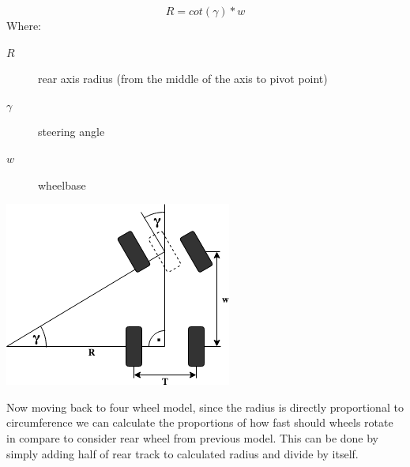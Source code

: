 \vspace{1em}
\begin{minipage}{0.6\textwidth}
    \begin{equation}\label{diff_eq_w}
        R = cot( \gamma ) * w
    \end{equation}
    Where:
    \begin{description}
        \item[$R$] rear axis radius (from the middle of the axis to pivot point)
        \item[$\gamma$] steering angle
        \item[$w$] wheelbase
    \end{description}
\end{minipage}
\hfill
\begin{minipage}{0.35\textwidth}
    \includegraphics[width=\textwidth]{figures/diff_calc}
\end{minipage}
\vspace{1em}

Now moving back to four wheel model, since the radius is directly proportional to circumference we can calculate the proportions of how fast should wheels rotate in compare to consider rear wheel from previous model. This can be done by simply adding half of rear track to calculated radius and divide by itself.



